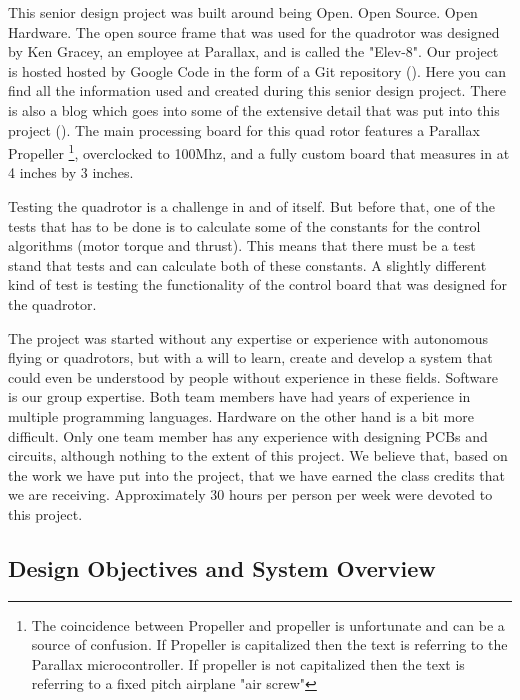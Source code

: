 \documentclass{article}
\numberwithin{equation}{section} %
\begin{document}
This senior design project was built around being Open. Open Source. Open Hardware. The open source frame that was used for the quadrotor was designed by Ken Gracey, an employee at Parallax, and is called the "Elev-8". Our project is hosted hosted by Google Code in the form of a Git repository (\cite{anzhelka_code}). Here you can find all the information used and created during this senior design project. There is also a blog which goes into some of the extensive detail that was put into this project (\cite{anzhelka_blog}). The main processing board for this quad rotor features a Parallax Propeller \footnote{The coincidence between Propeller and propeller is unfortunate and can be a source of confusion. If Propeller is capitalized then the text is referring to the Parallax microcontroller. If propeller is not capitalized then the text is referring to a fixed pitch airplane "air screw"}, overclocked to 100Mhz, and a fully custom board that measures in at 4 inches by 3 inches.

Testing the quadrotor is a challenge in and of itself. But before that, one of the tests that has to be done is to calculate some of the constants for the control algorithms (motor torque and thrust). This means that there must be a test stand that tests and can calculate both of these constants. A slightly different kind of test is testing the functionality of the control board that was designed for the quadrotor.

The project was started without any expertise or experience with autonomous flying or quadrotors, but with a will to learn, create and develop a system that could even be understood by people without experience in these fields. Software is our group expertise. Both team members have had years of experience in multiple programming languages. Hardware on the other hand is a bit more difficult. Only one team member has any experience with designing PCBs and circuits, although nothing to the extent of this project. We believe that, based on the work we have put into the project, that we have earned the class credits that we are receiving. Approximately 30 hours per person per week were devoted to this project.

\subsection{Design Objectives and System Overview}
\end{document}
